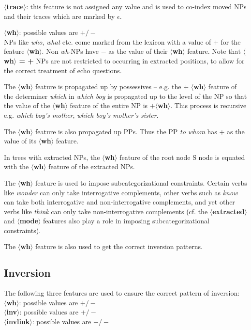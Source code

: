 \noindent
{\bf $\langle$trace$\rangle$}: this feature is not assigned any value and
is used to co-index moved NPs and their traces which are marked by
$\epsilon$.

\noindent
{\bf $\langle$wh$\rangle$}: possible values are {\bf $+/-$}\\ NPs like
{\em who}, {\em what} etc. come marked from the lexicon with a value
of {\bf $+$} for the feature {\bf $\langle$wh$\rangle$}.  Non {\em
wh}-NPs have {\bf $-$} as the value of their {\bf
$\langle$wh$\rangle$} feature. Note that {\bf $\langle$wh$\rangle$ = +
} NPs are not restricted to occurring in extracted positions, to allow
for the correct treatment of echo questions.

The {\bf $\langle$wh$\rangle$} feature is propagated up by possessives
-- e.g. the $+$ {\bf $\langle$wh$\rangle$} feature of the determiner
{\em which} in {\em which boy} is propagated up to the level of the NP
so that the value of the {\bf $\langle$wh$\rangle$} feature of the
entire NP is $+${\bf $\langle$wh$\rangle$}. This process is recursive
e.g. {\em which boy's mother}, {\em which boy's mother's sister}.

The {\bf $\langle$wh$\rangle$} feature
is also propagated up PPs. Thus the PP {\em to whom} has $+$ as the value of its 
{\bf $\langle$wh$\rangle$} feature. 

In trees with extracted NPs, the {\bf $\langle$wh$\rangle$} feature of the
root node S node is equated with the {\bf $\langle$wh$\rangle$} feature
of the extracted NPs. 

The {\bf $\langle$wh$\rangle$} feature is used to impose
subcategorizational constraints.
Certain verbs like {\em wonder} can
only take interrogative complements, other verbs such as {\em know}
can take both interrogative and non-interrogative complements, and yet
other verbs like {\em think} can only take non-interrogative
complements (cf. the {\bf $\langle$extracted$\rangle$} and {\bf
$\langle$mode$\rangle$} features also play a role in imposing 
subcategorizational constraints).

The {\bf $\langle$wh$\rangle$} feature is also used to get the correct
inversion patterns.


\subsection{Inversion}
The following three features are used to ensure the correct pattern of
inversion:\\
{\bf $\langle$wh$\rangle$}: possible values are {\bf $+/-$}\\
{\bf $\langle$inv$\rangle$}: possible values are {\bf $+/-$}\\
{\bf $\langle$invlink$\rangle$}: possible values are {\bf $+/-$}

